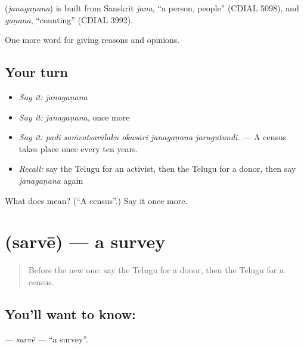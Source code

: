 \begin{cousinweb}
\textbf{} (\emph{janagaṇana}) is built from Sanskrit \emph{jana}, \textquotedblleft{}a person, people\textquotedblright{} (CDIAL 5098), and \emph{gaṇana}, \textquotedblleft{}counting\textquotedblright{} (CDIAL 3992).
\end{cousinweb}

\begin{grammarlens}[title={What you've built}]
One more word for giving reasons and opinions.
\end{grammarlens}

\subsection*{Your turn}
\begin{itemize}
\raggedright
  \item \emph{Say it:} \emph{janagaṇana}
  \item \emph{Say it:} \emph{janagaṇana}, once more
  \item \emph{Say it:} \emph{padi saṁvatsarālaku okasāri janagaṇana jarugutundi.} — A census takes place once every ten years.
  \item \emph{Recall:} say the Telugu for an activist, then the Telugu for a donor, then say \emph{janagaṇana} again
\end{itemize}

\begin{tcolorbox}[breakable,colback=teal!4,colframe=teal!35!black,title={Before you move on}]
What does  mean? (\textquotedblleft{}A census\textquotedblright{}.) Say it once more.
\end{tcolorbox}
\section[\texorpdfstring{\te{సర్వే} (sarvē)}{సర్వే (sarvē)}]{ (sarvē) — a survey}

\label{lesson:TE-C411-sarve}



\begin{quote}
Before the new one: say the Telugu for a donor, then the Telugu for a census.
\end{quote}

\subsection*{You'll want to know: }
\textbf{} — \emph{sarvē} — \textquotedblleft{}a survey\textquotedblright{}.

